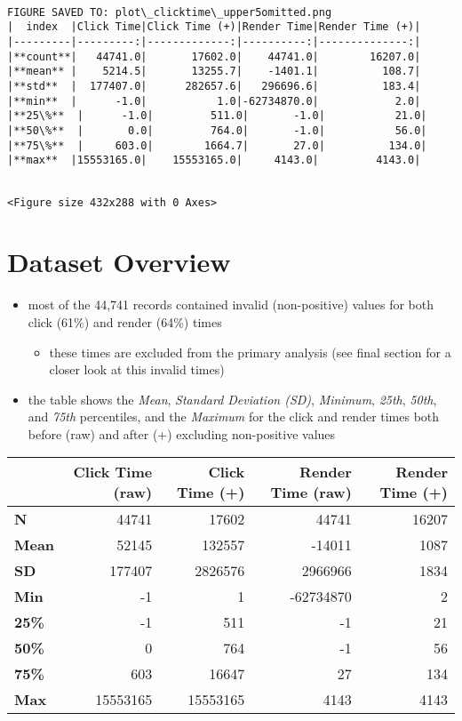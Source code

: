 \documentclass[11pt]{article}
\providecommand{\tightlist}{%
      \setlength{\itemsep}{0pt}\setlength{\parskip}{0pt}}
\begin{document}
    \begin{Verbatim}[commandchars=\\\{\}]

FIGURE SAVED TO: plot\_clicktime\_upper5omitted.png
|  index  |Click Time|Click Time (+)|Render Time|Render Time (+)|
|---------|---------:|-------------:|----------:|--------------:|
|**count**|   44741.0|       17602.0|    44741.0|        16207.0|
|**mean** |    5214.5|       13255.7|    -1401.1|          108.7|
|**std**  |  177407.0|      282657.6|   296696.6|          183.4|
|**min**  |      -1.0|           1.0|-62734870.0|            2.0|
|**25\%**  |      -1.0|         511.0|       -1.0|           21.0|
|**50\%**  |       0.0|         764.0|       -1.0|           56.0|
|**75\%**  |     603.0|        1664.7|       27.0|          134.0|
|**max**  |15553165.0|    15553165.0|     4143.0|         4143.0|


    \end{Verbatim}

    
    \begin{verbatim}
<Figure size 432x288 with 0 Axes>
    \end{verbatim}

    
    \hypertarget{dataset-overview}{%
\section{Dataset Overview}\label{dataset-overview}}

\begin{itemize}
\tightlist
\item
  most of the 44,741 records contained invalid (non-positive) values for
  both click (61\%) and render (64\%) times

  \begin{itemize}
  \tightlist
  \item
    these times are excluded from the primary analysis (see final
    section for a closer look at this invalid times)
  \end{itemize}
\item
  the table shows the \emph{Mean}, \emph{Standard Deviation (SD)},
  \emph{Minimum}, \emph{25th}, \emph{50th}, and \emph{75th} percentiles,
  and the \emph{Maximum} for the click and render times both before
  (raw) and after (+) excluding non-positive values
\end{itemize}

\begin{longtable}[]{@{}lrrrr@{}}
\toprule
& Click Time (raw) & Click Time (+) & Render Time (raw) & Render Time
(+)\tabularnewline
\midrule
\endhead
\textbf{N} & 44741 & 17602 & 44741 & 16207\tabularnewline
\textbf{Mean} & 52145 & 132557 & -14011 & 1087\tabularnewline
\textbf{SD} & 177407 & 2826576 & 2966966 & 1834\tabularnewline
\textbf{Min} & -1 & 1 & -62734870 & 2\tabularnewline
\textbf{25\%} & -1 & 511 & -1 & 21\tabularnewline
\textbf{50\%} & 0 & 764 & -1 & 56\tabularnewline
\textbf{75\%} & 603 & 16647 & 27 & 134\tabularnewline
\textbf{Max} & 15553165 & 15553165 & 4143 & 4143\tabularnewline
\bottomrule
\end{longtable}
\end{document}
